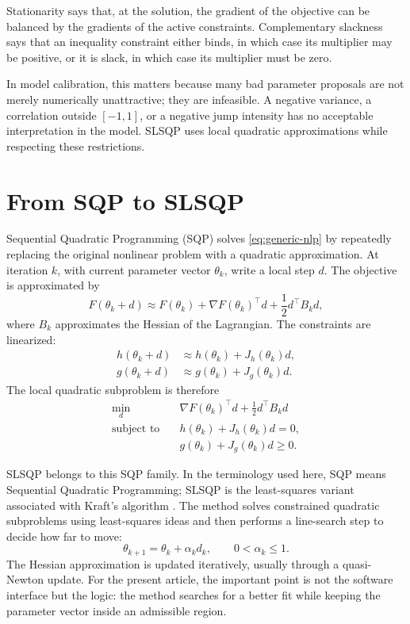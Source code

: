\documentclass[a4paper,10pt,titlepage,oneside,openany]{book}
\theoremstyle{plain}
\theoremstyle{definition}
\theoremstyle{remark}
\begin{document}
Stationarity says that, at the solution, the gradient of the objective can be balanced by the gradients of the active constraints. Complementary slackness says that an inequality constraint either binds, in which case its multiplier may be positive, or it is slack, in which case its multiplier must be zero.

In model calibration, this matters because many bad parameter proposals are not merely numerically unattractive; they are infeasible. A negative variance, a correlation outside \([-1,1]\), or a negative jump intensity has no acceptable interpretation in the model. SLSQP uses local quadratic approximations while respecting these restrictions.

\section{From SQP to SLSQP}

Sequential Quadratic Programming (SQP) solves \eqref{eq:generic-nlp} by repeatedly replacing the original nonlinear problem with a quadratic approximation. At iteration \(k\), with current parameter vector \(\theta_k\), write a local step \(d\). The objective is approximated by
\begin{equation}
    F(\theta_k+d)
    \approx
    F(\theta_k)
    + \nabla F(\theta_k)^\top d
    + \frac{1}{2} d^\top B_k d,
\end{equation}
where \(B_k\) approximates the Hessian of the Lagrangian. The constraints are linearized:
\begin{align}
    h(\theta_k+d)
    &\approx h(\theta_k)+J_h(\theta_k)d,\\
    g(\theta_k+d)
    &\approx g(\theta_k)+J_g(\theta_k)d.
\end{align}
The local quadratic subproblem is therefore
\begin{align}
    \min_d \quad &
    \nabla F(\theta_k)^\top d
    + \frac{1}{2}d^\top B_kd
    \label{eq:qp-subproblem}\\
    \text{subject to}\quad &
    h(\theta_k)+J_h(\theta_k)d=0, \nonumber\\
    &
    g(\theta_k)+J_g(\theta_k)d\geq0. \nonumber
\end{align}

SLSQP belongs to this SQP family. In the terminology used here, SQP means Sequential Quadratic Programming; SLSQP is the least-squares variant associated with Kraft's algorithm \cite{Kraft1988}. The method solves constrained quadratic subproblems using least-squares ideas and then performs a line-search step to decide how far to move:
\begin{equation}
    \theta_{k+1} = \theta_k+\alpha_k d_k,\qquad 0<\alpha_k\leq1.
\end{equation}
The Hessian approximation is updated iteratively, usually through a quasi-Newton update. For the present article, the important point is not the software interface but the logic: the method searches for a better fit while keeping the parameter vector inside an admissible region.
\end{document}
